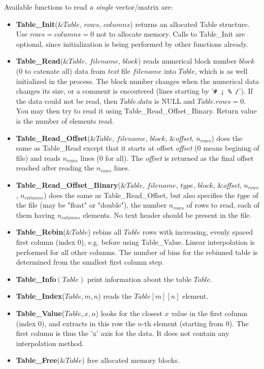 Available functions to read \emph{a single} vector/matrix are:
\begin{itemize}
\item {\bf Table\_Init}(\&$Table$, $rows$, $columns$) returns an allocated
  Table structure. Use $rows=columns=0$ not to allocate memory.
  Calls to Table\_Init are optional, since initialization is being
  performed by other functions already.
\item {\bf Table\_Read}(\&$Table$, $filename$, $block$)
  reads numerical block number
  $block$ (0 to catenate all) data from \emph{text} file $filename$ into $Table$,
  which is as well initialized in the process.
  The block number changes when the numerical data changes its size,
  or a comment is encoutered (lines starting
  by '\verb+# ; % /+'). If the data could not be read,
  then $Table.data$ is NULL and $Table.rows = 0$.
  You may then try to read it using Table\_Read\_Offset\_Binary.
  Return value is the number of elements read.
\item {\bf Table\_Read\_Offset}(\&$Table$, $filename$, $block$, \&\textit{offset}, $n_{rows}$)
  does the same as Table\_Read except that it starts at offset \textit{offset}
  (0 means begining of file) and reads $n_{rows}$ lines (0 for all).
  The \textit{offset} is returned as the final offset reached after
  reading the $n_{rows}$ lines.
\item {\bf Table\_Read\_Offset\_Binary}(\&$Table$, $filename$, $type$,
  $block$, \&\textit{offset}, $n_{rows}$, $n_{columns}$) does the same as
  Table\_Read\_Offset, but also specifies the $type$ of the file (may
  be "float" or "double"), the number $n_{rows}$ of rows to read, each
  of them having $n_{columns}$ elements. No text header should be present
  in the file.
\item {\bf Table\_Rebin}(\&$Table$) rebins all $Table$ rows with increasing, evenly spaced first column (index 0), e.g. before using Table\_Value. Linear interpolation is performed for all other columns. The number of bins for the rebinned table is determined from the smallest first column step.
\item {\bf Table\_Info}$(Table)$ print information about the table $Table$.
\item {\bf Table\_Index}($Table, m, n$) reads the $Table[m][n]$ element.
\item {\bf Table\_Value}($Table, x, n$) looks for the closest $x$
  value in the first column (index 0), and extracts in this row the
  $n$-th element (starting from 0). The first column is thus the 'x' axis for the data. It does not contain any interpolation method.
\item {\bf Table\_Free}(\&$Table$) free allocated memory blocks.
\end{itemize}

